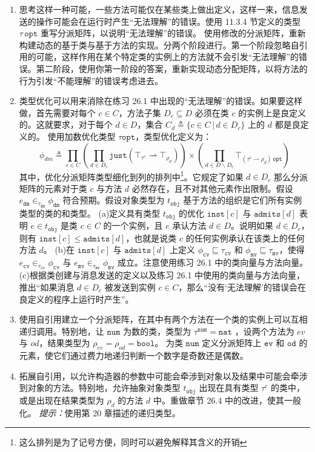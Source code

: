 \begin{enumerate}
\item
思考这样一种可能，一些方法可能仅在某些类上做出定义，这样一来，信息发送的操作可能会在运行时产生“无法理解”的错误。使用 11.3.4 节定义的类型 $\tau \, \mathtt{opt}$ 重写分派矩阵，以说明“无法理解”的错误。
使用修改的分派矩阵，重新构建动态的基于类与基于方法的实现。分两个阶段进行。第一个阶段忽略自引用的可能，这样作用在某个特定类的实例上的方法就不会引发“无法理解”的错误。第二阶段，使用你第一阶段的答案，重新实现动态分配矩阵，以将方法的行为引发“不能理解”的错误考虑进去。

\item
类型优化可以用来消除在练习 26.1 中出现的“无法理解”的错误。如果要这样做，首先需要对每个 $c \in C$，方法子集 $ D_c \subseteq D $ 必须在类 $c$ 的实例上是良定义的。这就要求，对于每个 $d \in D$，集合 $C_d \triangleq \{ c \in C \, | \, d \in D_c\}$ 上的 $d$ 都是良定义的。
使用加数优化类型 $\tau \mathtt{opt}$，类型优化定义为：
$$ \phi_{dm} \triangleq \prod_{c \in C}(\prod_{d \in D_c} \mathtt{just} (\top_{\tau^{c}} \rightharpoonup \top_{\rho_{d}})) \times (\prod_{d \in D \backslash D_c} \top_{(\tau^{c} \rightharpoonup \rho_d) \, \mathtt{opt}}) $$
其中，优化分派矩阵类型细化到列的排列中\footnote[3]{这么排列是为了记号方便，同时可以避免解释其含义的开销}。它规定了如果 $d \in D_c$ 那么分派矩阵的元素对于类 $c$ 与方法 $d$ 必然存在，且不对其他元素作出限制。假设 $e_{\mathtt{dm}} \in_{\tau_{\mathtt{dm}}} \phi_{\mathtt{dm}}$ 符合预期。假设对象类型为 $t_{\mathtt{obj}}$ 基于方法的组织是它们所有实例类型的类的和类型。
(a)定义具有类型 $t_{\mathtt{obj}}$ 的优化 $\mathtt{inst}[c]$ 与 $\mathtt{admits}[d]$ 表明 $e \in t_{\mathtt{obj}}$ 是类 $c \in C$ 的一个实例，且 $e$ 承认方法  $d \in D$。说明如果 $d \in D_c$，则有 $\mathtt{inst}[c] \leq \mathtt{admits}[d]$，也就是说类 $c$ 的任何实例承认在该类上的任何方法 $d$。
(b)在 $\mathtt{inst}[c]$ 与 $\mathtt{admits}[d]$ 上定义 $\phi_{\mathtt{cv}} \sqsubseteq \tau_{\mathtt{cv}}$ 和 $\phi_{\mathtt{mv}} \sqsubseteq \tau_{\mathtt{mv}}$，使得 $e_{\mathtt{cv}} \in_{\tau_{\mathtt{cv}}} \phi_{\mathtt{cv}}$ 与 $ e_{\mathtt{mv}} \in_{\tau_{\mathtt{mv}}} \phi_{\mathtt{mv}} $ 成立。注意使用练习 26.1 中的类向量与方法向量。
(c)根据类创建与消息发送的定义以及练习 26.1 中使用的类向量与方法向量，推出“如果消息 $d \in D_c$ 被发送到实例 $c \in C$，那么“没有‘无法理解’的错误会在良定义的程序上运行时产生”。

\item
使用自引用建立一个分派矩阵，在其中有两个方法在一个类的实例上可以互相递归调用。特别地，让 $\mathtt{num}$ 为数的类，类型为 $\tau^{\mathtt{num}} = \mathtt{nat}$ ，设两个方法为 $ev$ 与 $od$，结果类型为 $\rho_{ev} = \rho_{od} = \mathtt{bool}$。
为类 $\mathtt{num}$ 定义分派矩阵上 $\mathtt{ev}$ 和 $\mathtt{od}$ 的元素，使它们通过费力地递归判断一个数字是奇数还是偶数。
\item
拓展自引用，以允许构造器的参数中可能会牵涉到对象以及结果中可能会牵涉到对象的方法。特别地，允许抽象对象类型 $t_{\mathtt{obj}}$ 出现在具有类型 $\tau^{c}$ 的类中，或是出现在结果类型为 $\rho_{d}$ 的方法 $d$ 中。重做章节 26.4 中的改进，使其一般化。
\textit{提示：}使用第 20 章描述的递归类型。

\end{enumerate}
